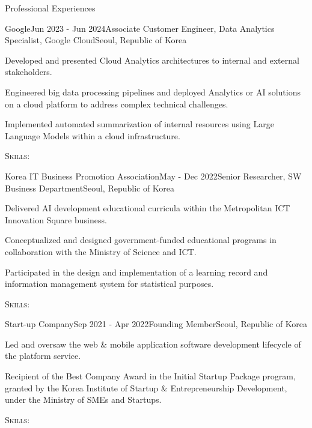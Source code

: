\documentclass[
	a4paper, %
	11pt, %
]{resume} %
\begin{document}
\begin{rSection}{Professional Experiences}

	\begin{rSubsection}{Google}{Jun 2023 - Jun 2024}{Associate Customer Engineer, Data Analytics Specialist, Google Cloud}{Seoul, Republic of Korea}
		\item {Developed and presented Cloud Analytics architectures to internal and external stakeholders.}
		\item {Engineered big data processing pipelines and deployed Analytics or AI solutions on a cloud platform to address complex technical challenges.}
		\item {Implemented automated summarization of internal resources using Large Language Models within a cloud infrastructure.}
		\item {\textsc{Skills:}}
	\end{rSubsection}


	\begin{rSubsection}{Korea IT Business Promotion Association}{May - Dec 2022}{Senior Researcher, SW Business Department}{Seoul, Republic of Korea}
		\item {Delivered AI development educational curricula within the Metropolitan ICT Innovation Square business.}
		\item {Conceptualized and designed government-funded educational programs in collaboration with the Ministry of Science and ICT.}
		\item {Participated in the design and implementation of a learning record and information management system for statistical purposes.}
		\item {\textsc{Skills:}}
	\end{rSubsection}


	\begin{rSubsection}{Start-up Company}{Sep 2021 - Apr 2022}{Founding Member}{Seoul, Republic of Korea}
		\item {Led and oversaw the web \& mobile application software development lifecycle of the platform service.}
		\item {Recipient of the Best Company Award in the Initial Startup Package program, granted by the Korea Institute of Startup \& Entrepreneurship Development, under the Ministry of SMEs and Startups.}
		\item {\textsc{Skills:}}
	\end{rSubsection}

\end{rSection}
\end{document}
